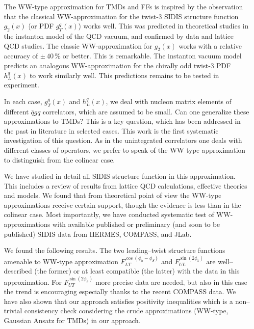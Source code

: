 \documentclass[a4paper,11pt]{article}
\begin{document}
The WW-type approximation for TMDs and FFs is inspired by the
observation that the classical WW-approximation for the twist-3
SIDIS structure function $g_2(x)$ (or PDF $g_T^q(x)$) works well. 
This was predicted in theoretical studies in the instanton model 
of the QCD vacuum, and confirmed by data and lattice QCD studies.
The classic WW-approximation for $g_2(x)$ works with a relative
accuracy of $\pm\,40\,\%$ or better. This is remarkable.
The instanton vacuum model predicts an analogous WW-approximation
for the chirally odd twist-3 PDF $h_L^q(x)$ to work similarly
well. This predictions remains to be tested in experiment.

In each case, $g_T^q(x)$ and $h_L^q(x)$, we deal with nucleon
matrix elements of different $\bar{q}gq$ correlators, which are 
assumed to be small. Can one generalize these approximations to
TMDs? This is a key question, which has been addressed in the
past in literature in selected cases. This work is the first
systematic investigation of this question.
As in the unintegrated correlators one deals with different
classes of operators, we prefer to speak of the
WW-type approximation to distinguish from the colinear case.

We have studied in detail all SIDIS structure function in 
this approximation. This includes a review of results from 
lattice QCD calculations, effective theories and models.
We found that from theoretical point of view the WW-type
approximations receive certain support, though the 
evidence is less than in the colinear case.
Most importantly, we have conducted systematic test of
WW-approximations with available published or 
preliminary (and soon to be published) SIDIS data
from HERMES, COMPASS, and JLab.

We found the following results. The two leading--twist 
structure functions amenable to WW-type approximation 
	$F_{LT}^{\cos(\phi_h -\phi_S)}$ and 
	$F_{UL}^{\sin(2\phi_h)}$ 
are well--described (the former) or at least compatible 
(the latter) with the data in this approximation. For 
$F_{UT}^{\sin(2\phi_h)}$ more precise data are needed, 
but also in this case the trend is encouraging
especially thanks to the recent COMPASS data.
We have also shown that our approach satisfies positivity
inequalities which is a non--trivial consistency check 
considering the crude approximations (WW-type, Gaussian 
Ansatz for TMDs) in our approach.
\end{document}
